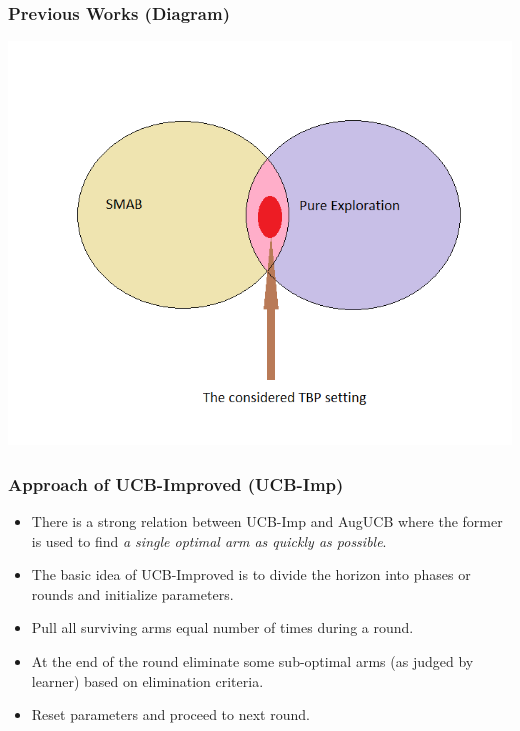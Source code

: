 \begin{frame}
\frametitle{Previous Works (Diagram)}
\centering
\includegraphics[scale=0.5]{img/Settings2.png}
\end{frame}

\begin{frame}
\frametitle{Approach of UCB-Improved (UCB-Imp)}
\begin{itemize}
\item<1-> There is a strong relation between UCB-Imp \cite{auer2010ucb} and AugUCB where the former is used to find \emph{a single optimal arm as quickly as possible}.
\item<2-> The basic idea of UCB-Improved is to divide the horizon into phases or rounds and initialize parameters.
\item<3-> Pull all surviving arms equal number of times during a round.
\item<4-> At the end of the round eliminate some sub-optimal arms (as judged by learner) based on elimination criteria.
\item<5-> Reset parameters and proceed to next round.
\end{itemize}
\end{frame}

